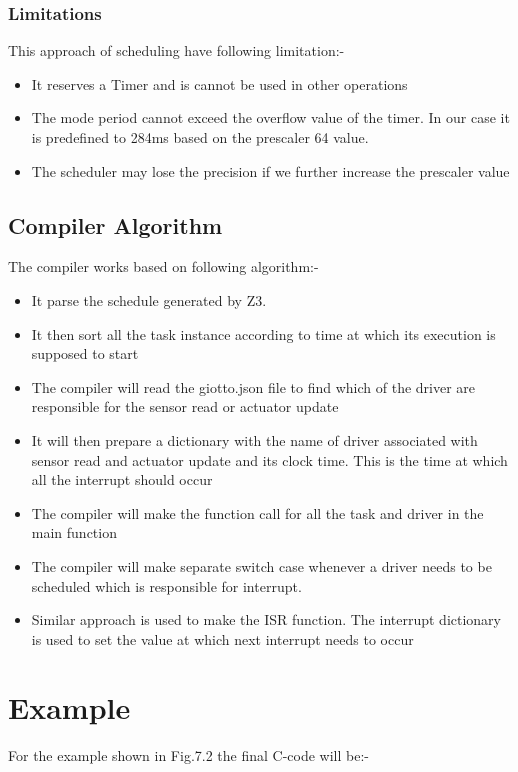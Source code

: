 \documentclass[16pt]{report}
\begin{document}
\subsubsection{Limitations}
This approach of scheduling have following limitation:-
\begin{itemize}
    \item It reserves a Timer and is cannot be used in other operations
    \item The mode period cannot exceed the overflow value of the timer. In our case it is predefined to 284ms based on the prescaler 64 value.
    \item The scheduler may lose the precision if we further increase the prescaler value
\end{itemize}

\subsection{Compiler Algorithm}
The compiler works based on following algorithm:-
\begin{itemize}
    \item It parse the schedule generated by Z3.
    \item It then sort all the task instance according to time at which its execution is supposed to start
    \item The compiler will read the giotto.json file to find which of the driver are responsible for the sensor read or actuator update
    \item It will then prepare a dictionary with the name of driver associated with sensor read and actuator update and its clock time. This is the time at which all the interrupt should occur
    \item The compiler will make the function call for all the task and driver in the main function
    \item The compiler will make separate switch case whenever a driver needs to be scheduled which is responsible for interrupt.
    \item Similar approach is used to make the ISR function. The interrupt dictionary is used to set the value at which next interrupt needs to occur
\end{itemize}

\section{Example}
For the example shown in Fig.7.2 the final C-code will be:-
\end{document}
